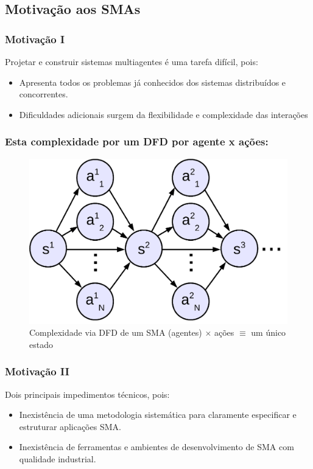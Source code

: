 \documentclass[10pt]{beamer}
\begin{document}
\subsection{Motivação aos SMAs}
\begin{frame} [allowframebreaks=0.9]

    \frametitle{Motivação I}
    Projetar e construir sistemas multiagentes é uma tarefa difícil, pois:
    \begin{itemize}
    \pause
      \item Apresenta todos os problemas já conhecidos 
dos sistemas distribuídos e concorrentes.
\pause
      \item Dificuldades adicionais surgem da flexibilidade 
e complexidade das interações
    
    \end{itemize}
\end{frame}



\begin{frame}
\frametitle{Esta complexidade por um DFD por agente x ações:}
  
  \begin{figure}[!ht]
  \centering
  \includegraphics[height =.6\textheight,width=.7\textwidth]{figuras/mudando_estados01.png}
  \caption{Complexidade via DFD de um SMA (agentes) $\times $ ações $\equiv $ um único estado}
\end{figure}
   
\end{frame}




\begin{frame}

    \frametitle{Motivação II}
   Dois principais impedimentos técnicos, pois:
    \begin{itemize}
    \pause
      \item Inexistência de uma metodologia sistemática para 
      claramente especificar e estruturar aplicações SMA.
     \pause
      \item Inexistência de ferramentas e ambientes de 
desenvolvimento de SMA com qualidade industrial.
    
    \end{itemize}
\end{frame}
\end{document}
